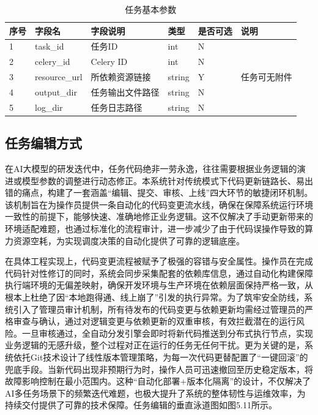 \begin{table}[htbp]
    \centering
    \caption{任务基本参数}
    \begin{tabular}{llllll}
        \toprule
        序号 & 字段名 & 字段说明 & 类型 & 是否可选 & 说明 \\
        \midrule
1 & task\_id & 任务ID & int & N &  \\
2 & celery\_id & Celery ID & int & N &  \\
3 & resource\_url & 所依赖资源链接 & string & Y & 任务可无附件 \\
4 & output\_dir & 任务输出文件路径 & string & N &  \\
5 & log\_dir & 任务日志路径 & string & N &  \\
        \bottomrule
    \end{tabular}
    \label{tab:my_label}
\end{table}

\subsection{任务编辑方式}

在AI大模型的研发迭代中，任务代码绝非一劳永逸，往往需要根据业务逻辑的演进或模型参数的调整进行动态修正。本系统针对传统模式下代码更新链路长、易出错的痛点，构建了一套涵盖“编辑、提交、审核、上线”四大环节的敏捷闭环机制。该机制旨在为操作员提供一条自动化的代码变更流水线，确保在保障系统运行环境一致性的前提下，能够快速、准确地修正业务逻辑。这不仅解决了手动更新带来的环境适配难题，也通过标准化的流程审计，进一步减少了由于代码误操作导致的算力资源空耗，为实现调度决策的自动化提供了可靠的逻辑底座。

在具体工程实现上，代码变更流程被赋予了极强的容错与安全属性。操作员在完成代码针对性修订的同时，系统会同步采集配套的依赖库信息，通过自动化构建保障执行端环境的无偏差映射，确保开发环境与生产环境在依赖层面保持严格一致，从根本上杜绝了因“本地跑得通、线上崩了”引发的执行异常。为了筑牢安全防线，系统引入了管理员审计机制，所有待发布的代码变更与依赖更新均需经过管理员的严格审查与确认，通过对逻辑变更与依赖更新的双重审核，有效拦截潜在的运行风险。一旦审核通过，全自动分发引擎会即时将新代码推送到分布式执行节点，实现业务逻辑的无感升级，整个过程对正在运行的任务无任何干扰。更为关键的是，系统依托Git技术设计了线性版本管理策略，为每一次代码更替配置了“一键回滚”的兜底手段。当新代码出现非预期行为时，操作人员可迅速撤回至历史稳定版本，将故障影响控制在最小范围内。这种“自动化部署+版本化隔离”的设计，不仅解决了AI多任务场景下的频繁迭代难题，也极大提升了系统的整体韧性与运维效率，为持续交付提供了可靠的技术保障。任务编辑的垂直泳道图如图5.11所示。

